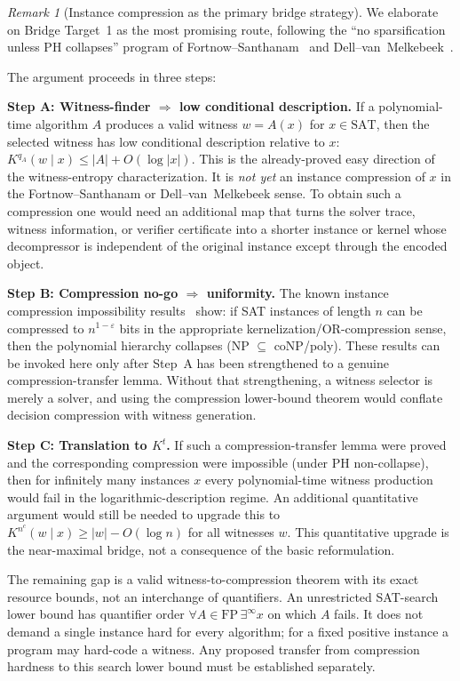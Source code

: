 \documentclass[aps,prd,twocolumn,superscriptaddress,nofootinbib]{revtex4-2}
\theoremstyle{definition}
\theoremstyle{remark}
\newtheorem{remark}[theorem]{Remark}
\begin{document}
\begin{remark}[Instance compression as the primary bridge strategy]
\label{rem:compression-bridge}
We elaborate on Bridge Target~1 as the most promising route, following the ``no sparsification unless PH collapses'' program of Fortnow--Santhanam~\cite{FortnowSanthanam2011} and Dell--van~Melkebeek~\cite{DellMelkebeek2014}.

The argument proceeds in three steps:

\textbf{Step A: Witness-finder $\Rightarrow$ low conditional description.}
If a polynomial-time algorithm $A$ produces a valid witness $w=A(x)$ for $x\in\mathrm{SAT}$, then the selected witness has low conditional description relative to $x$: $K^{q_A}(w\mid x)\leq |A|+O(\log |x|)$. This is the already-proved easy direction of the witness-entropy characterization. It is \emph{not yet} an instance compression of $x$ in the Fortnow--Santhanam or Dell--van~Melkebeek sense. To obtain such a compression one would need an additional map that turns the solver trace, witness information, or verifier certificate into a shorter instance or kernel whose decompressor is independent of the original instance except through the encoded object.

\textbf{Step B: Compression no-go $\Rightarrow$ uniformity.}
The known instance compression impossibility results~\cite{FortnowSanthanam2011,DellMelkebeek2014,Drucker2015} show: if SAT instances of length $n$ can be compressed to $n^{1-\varepsilon}$ bits in the appropriate kernelization/OR-compression sense, then the polynomial hierarchy collapses (NP $\subseteq$ coNP/poly). These results can be invoked here only after Step~A has been strengthened to a genuine compression-transfer lemma. Without that strengthening, a witness selector is merely a solver, and using the compression lower-bound theorem would conflate decision compression with witness generation.

\textbf{Step C: Translation to $K^t$.}
If such a compression-transfer lemma were proved and the corresponding compression were impossible (under PH non-collapse), then for infinitely many instances $x$ every polynomial-time witness production would fail in the logarithmic-description regime. An additional quantitative argument would still be needed to upgrade this to $K^{n^c}(w \mid x) \geq |w| - O(\log n)$ for all witnesses $w$. This quantitative upgrade is the near-maximal bridge, not a consequence of the basic reformulation.

The remaining gap is a valid witness-to-compression theorem with its exact resource bounds, not an interchange of quantifiers. An unrestricted SAT-search lower bound has quantifier order $\forall A\in\mathrm{FP}\,\exists^\infty x$ on which $A$ fails. It does not demand a single instance hard for every algorithm; for a fixed positive instance a program may hard-code a witness. Any proposed transfer from compression hardness to this search lower bound must be established separately.
\end{remark}
\end{document}
